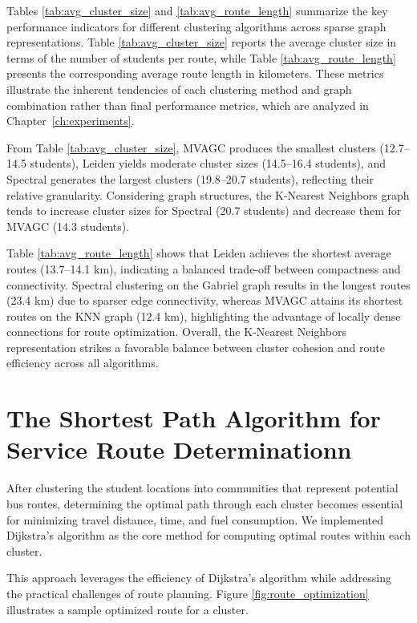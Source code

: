 Tables \ref{tab:avg_cluster_size} and \ref{tab:avg_route_length} summarize the key performance indicators for different clustering algorithms across sparse graph representations. Table \ref{tab:avg_cluster_size} reports the average cluster size in terms of the number of students per route, while Table \ref{tab:avg_route_length} presents the corresponding average route length in kilometers. These metrics illustrate the inherent tendencies of each clustering method and graph combination rather than final performance metrics, which are analyzed in Chapter~\ref{ch:experiments}.

From Table \ref{tab:avg_cluster_size}, MVAGC produces the smallest clusters (12.7--14.5 students), Leiden yields moderate cluster sizes (14.5--16.4 students), and Spectral generates the largest clusters (19.8--20.7 students), reflecting their relative granularity. Considering graph structures, the K-Nearest Neighbors graph tends to increase cluster sizes for Spectral (20.7 students) and decrease them for MVAGC (14.3 students).

Table \ref{tab:avg_route_length} shows that Leiden achieves the shortest average routes (13.7--14.1 km), indicating a balanced trade-off between compactness and connectivity. Spectral clustering on the Gabriel graph results in the longest routes (23.4 km) due to sparser edge connectivity, whereas MVAGC attains its shortest routes on the KNN graph (12.4 km), highlighting the advantage of locally dense connections for route optimization. Overall, the K-Nearest Neighbors representation strikes a favorable balance between cluster cohesion and route efficiency across all algorithms.

\section{The Shortest Path Algorithm for Service Route Determinationn}
\label{sec:shortest_path}

After clustering the student locations into communities that represent potential bus routes, determining the optimal path through each cluster becomes essential for minimizing travel distance, time, and fuel consumption. We implemented Dijkstra's algorithm as the core method for computing optimal routes within each cluster.

This approach leverages the efficiency of Dijkstra's algorithm while addressing the practical challenges of route planning. Figure \ref{fig:route_optimization} illustrates a sample optimized route for a cluster.

